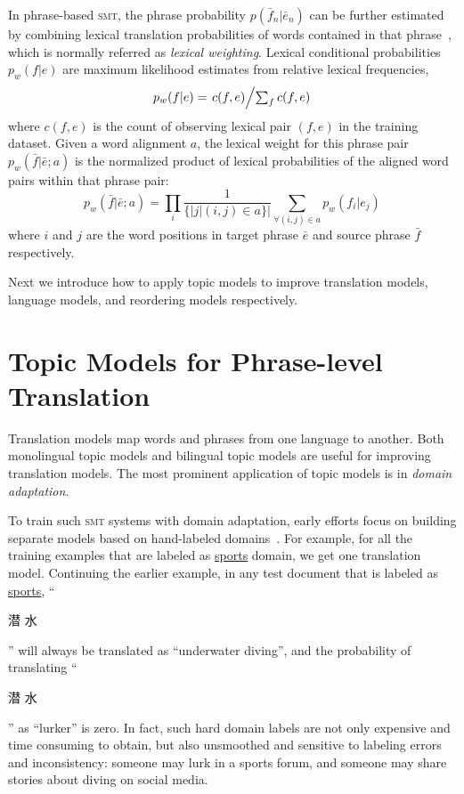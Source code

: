 In phrase-based \textsc{smt}, the phrase probability $p(\bar{f}_n |
\bar{e}_n)$ can be further estimated by combining lexical translation
probabilities of words contained in that phrase~\citep{koehn-03},
which is normally referred as \textit{lexical weighting}. Lexical
conditional probabilities $p_w(f|e)$ are maximum likelihood estimates
from relative lexical frequencies,
\begin{equation}
\label{eq:lexical_prob}
p_w(f|e) = \textstyle \left.c(f, e)\middle/\sum_f{c(f, e)}\right.
\end{equation}
where $c(f, e)$ is the count of observing lexical pair $(f, e)$ in the
training dataset. Given a word alignment $a$, the lexical weight for
this phrase pair $p_w(\bar{f} | \bar{e}; a)$ is the normalized product
of lexical probabilities of the aligned word pairs within that phrase
pair:
\begin{equation}
\label{eq:phrase_prob}
p_w(\bar{f} | \bar{e}; a) = \prod_{i} \frac{1}{\{|j | (i, j) \in a\}|} \sum_{\forall (i,j) \in a} p_w(f_i | e_j)
\end{equation}
where $i$ and $j$ are the word positions in target phrase $\bar{e}$
and source phrase $\bar{f}$ respectively.

Next we introduce how to apply topic models to improve translation
models, language models, and reordering models respectively.


\section{Topic Models for Phrase-level Translation}
\label{sec:trans-multiling}

Translation models map words and phrases from one language to another.
Both monolingual topic models and bilingual topic models are useful for improving translation models.
The most prominent application of topic models is in {\em domain adaptation}.

To train such \textsc{smt} systems with domain adaptation, early
efforts focus on building separate models based on hand-labeled
domains~\citep{foster-07,matsoukas-09,chiang-11}. For example, for all
the training examples that are labeled as \underline{sports} domain, we get 
one translation model. Continuing the earlier example, in any test document
that is labeled as \underline{sports}, ``\begin{CJK*}{UTF8}{gbsn}潜
  水\end{CJK*}'' will always be translated as ``underwater diving'', and
  the probability of translating ``\begin{CJK*}{UTF8}{gbsn}潜
    水\end{CJK*}'' as ``lurker'' is zero. In fact, such hard domain
    labels are not only expensive and time consuming to obtain, but
    also unsmoothed and sensitive to labeling errors and inconsistency: someone may lurk in a sports forum, and someone may share stories about diving on social media.

